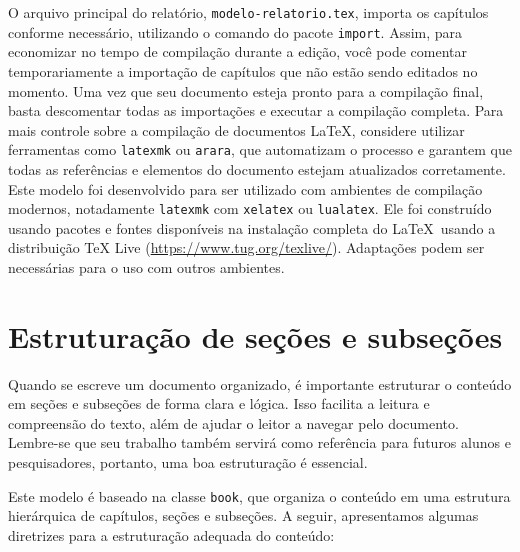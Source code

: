 O arquivo principal do relatório, \texttt{modelo-relatorio.tex}, importa os capítulos conforme
necessário, utilizando o comando \verb|| do pacote \texttt{import}. Assim, para economizar
no tempo de compilação durante a edição, você pode comentar temporariamente a importação de
capítulos que não estão sendo editados no momento. Uma vez que seu documento esteja pronto para a
compilação final, basta descomentar todas as importações e executar a compilação completa. Para mais
controle sobre a compilação de documentos \LaTeX, considere utilizar ferramentas como
\texttt{latexmk} ou \texttt{arara}, que automatizam o processo e garantem que todas as referências
e elementos do documento estejam atualizados corretamente. Este modelo foi desenvolvido para ser
utilizado com ambientes de compilação modernos, notadamente \texttt{latexmk} com \texttt{xelatex} ou
\texttt{lualatex}. Ele foi construído usando pacotes e fontes disponíveis na instalação completa do
\LaTeX\ usando a distribuição TeX Live (\url{https://www.tug.org/texlive/}). Adaptações podem ser necessárias para o uso com outros ambientes.

\section{Estruturação de seções e subseções}\label{sec:secoes-desenvolvimento}

Quando se escreve um documento organizado, é importante estruturar o conteúdo em seções e subseções
de forma clara e lógica. Isso facilita a leitura e compreensão do texto, além de ajudar o leitor a
navegar pelo documento. Lembre-se que seu trabalho também servirá como referência para futuros
alunos e pesquisadores, portanto, uma boa estruturação é essencial.

Este modelo é baseado na classe \texttt{book}, que organiza o conteúdo em uma estrutura hierárquica
de capítulos, seções e subseções. A seguir, apresentamos algumas diretrizes para a estruturação
adequada do conteúdo:

